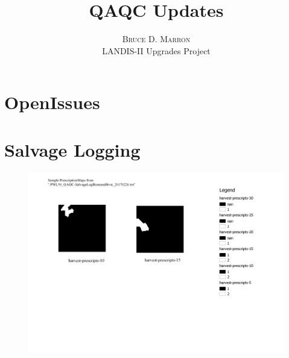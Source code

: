 \documentclass[twoside]{article}	%
\title{\vspace{-15mm}\fontsize{14pt}{10pt}\selectfont\textbf{QAQC Updates}} %
\author{
\large
\textsc{Bruce D. Marron} \\ %
\normalsize LANDIS-II Upgrades Project \\ %
\vspace{-5mm}
}
\date{}
\begin{document}
\maketitle                %
\thispagestyle{fancy}     %





\section{OpenIssues}
\footnotesize 


\section{Salvage Logging}


\begin{figure} [!htbp]
  \begin{center}
    \includegraphics[scale = 0.6]{graphics/PWL50_PrescriptionMaps_QAQCrun1}
    \caption{}
    \label{fig:}
  \end{center}
\end{figure}
\end{document}
